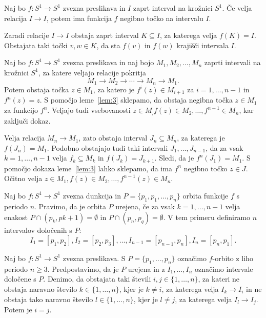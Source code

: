 \documentclass[../TG_magistrsko_delo_sections.tex]{subfiles}
\begin{document}
\begin{lema}\label{lem:3}		%
Naj bo $f : S^1 \to S^1$ zvezna preslikava in $I$ zaprt interval na krožnici $S^1$. Če velja relacija $I \to I$, potem ima funkcija $f$ negibno točko na intervalu $I$.
\end{lema}

\begin{dokaz}
Zaradi relacije $I \to I$ obstaja zaprt interval $K \subseteq I$, za katerega velja $f(K) = I$. Obstajata taki točki $v, w \in K$, da sta $f(v)$ in $f(w)$ krajišči intervala $I$.
\end{dokaz}

\begin{lema}\label{lem:4}				%
Naj bo $f : S^1 \to S^1$ zvezna preslikava in naj bojo $M_1, M_2, \dots, M_n$ zaprti intervali na krožnici $S^1$, za katere veljajo relacije pokritja 
$$M_1 \to M_2 \to \cdots \to M_n \to M_1.$$ 
Potem obstaja točka $z \in M_1$, za katero je $f^i(z) \in M_{i+1}$ za $i = 1, \dots, n-1$ in $f^n(z) =z$. S pomočjo leme~\ref{lem:3} sklepamo, da obstaja negibna točka $z \in M_1$ za funkcijo $f^n$. Veljajo tudi vsebovanosti $z \in M_, f(z) \in M_2, \dots, f^{n-1} \in M_n$, kar zaključi dokaz.
\end{lema}

\begin{dokaz}
Velja relacija $M_n \to M_1$, zato obstaja interval $J_n \subseteq M_n$, za katerega je $f(J_n) = M_1$. Podobno obstajajo tudi taki intervali $J_1, \dots, J_{n-1}$, da za vsak $k = 1, \dots, n-1$ velja $f_k \subseteq M_k$ in $f(J_k) = J_{k+1}$. Sledi, da je $f^n(J_1) = M_1$. S pomočjo dokaza leme~\ref{lem:3} lahko sklepamo, da ima $f^n$ negibno točko $z \in J$. Očitno velja $z \in M_1, f(z) \in M_2, \dots, f^{n-1}(z) \in M_n$.
\end{dokaz}

\begin{definicija}
Naj bo $f: S^1 \to S^1$ zvezna dunkcija in $P =\{p_1, p_1, \dots, p_n \}$ orbita funkcije $f$ s periodo $n$. Pravimo, da je orbita $P$ urejena, če za vsak $k=1, \dots, n-1$ velja enakost $P \cap (p_k, p{k+1}) = \emptyset$ in $P \cap (p_n, p_q) = \emptyset$. V tem primeru definiramo $n$ intervalov določenih s $P$:
$$I_1 = [p_1, p_2], I_2 = [p_2, p_3], \dots, I_{n-1} = [p_{n-1}, p_n], I_n = [p_n, p_1].$$
\end{definicija}

\begin{lema}\label{lem:5}					%
Naj bo $f : S^1 \to S^1$ zvezna preslikava. S $P=\{p_1, \dots, p_n\}$ označimo $f$-orbito z liho periodo $n \geq 3$. Predpostavimo, da je $P$ urejena in z $I_1, \dots, I_n$ označimo intervale določene s $P$. Denimo, da obstajata taki števili $i, j \in \{1, \dots, n \}$, za kateri ne obstaja naravno število $k \in \{1, \dots, n\}$, kjer je $k \neq i$, za katerega velja $I_k \to I_i$ in ne obstaja tako naravno število $l \in \{1, \dots, n\}$, kjer je $l \neq j$, za katerega velja $I_l \to I_j$. Potem je $i=j$.
\end{lema}
\end{document}
